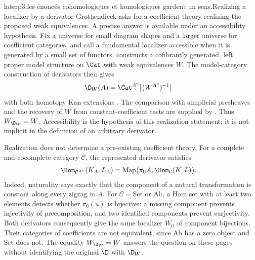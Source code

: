 \begin{dcomment}{later}{p3:les énoncés cohomologiques et homologiques gardent un sens.}{Realizing a localizer by a derivator}
Grothendieck asks for a coefficient theory realizing the proposed weak equivalences. A precise answer is available under an accessibility hypothesis. Fix a universe for small diagram shapes and a larger universe for coefficient categories, and call a fundamental localizer accessible when it is generated by a small set of functors. \citet[Theorem~5.2.15]{Cisinski2006} constructs a cofibrantly generated, left proper model structure on $\Cat$ with weak equivalences $W$. The model-category construction of derivators then gives
\[
 \D_W(A)=\Cat^{A^o}\bigl[(W^{A^o})^{-1}\bigr]
\]
with both homotopy Kan extensions \citep[Theorem~6.11 and its dual]{Cisinski2003}. The comparison with simplicial presheaves and the recovery of $W$ from constant-coefficient tests are supplied by \citet[Lemma~4.2.13, Theorem~4.2.15, and Corollary~4.2.18]{Cisinski2006}. Thus $W_{\D_W}=W$. Accessibility is the hypothesis of this realization statement; it is not implicit in the definition of an arbitrary derivator.

Realization does not determine a pre-existing coefficient theory. For a complete and cocomplete category $\mathcal C$, the represented derivator satisfies
\[
 \Hom_{\mathcal C^{A^o}}(K_A,L_A)
   =\operatorname{Map}\bigl(\pi_0 A,\Hom_{\mathcal C}(K,L)\bigr).
\]
Indeed, naturality says exactly that the component of a natural transformation is constant along every zigzag in $A$. For $\mathcal C=\mathrm{Set}$ or $\mathrm{Ab}$, a Hom set with at least two elements detects whether $\pi_0(u)$ is bijective: a missing component prevents injectivity of precomposition, and two identified components prevent surjectivity. Both derivators consequently give the same localizer $W_0$ of component bijections. Their categories of coefficients are not equivalent, since $\mathrm{Ab}$ has a zero object and $\mathrm{Set}$ does not. The equality $W_{\D_W}=W$ answers the question on these pages without identifying the original $\D$ with $\D_W$.
\end{dcomment}


